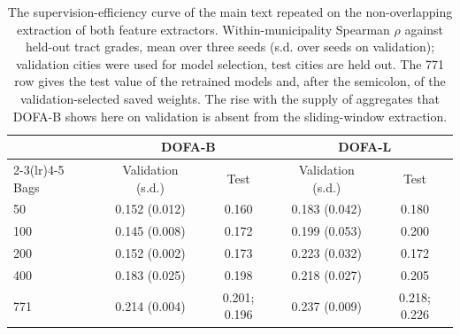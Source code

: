 \begin{table}[htbp]
\centering
\caption{The supervision-efficiency curve of the main text repeated on the non-overlapping extraction of both feature extractors. Within-municipality Spearman $\rho$ against held-out tract grades, mean over three seeds (s.d. over seeds on validation); validation cities were used for model selection, test cities are held out. The 771 row gives the test value of the retrained models and, after the semicolon, of the validation-selected saved weights. The rise with the supply of aggregates that DOFA-B shows here on validation is absent from the sliding-window extraction.}
\small
\begin{tabular}{lcccc}
\toprule
 & \multicolumn{2}{c}{DOFA-B} & \multicolumn{2}{c}{DOFA-L}\\
\cmidrule(lr){2-3}\cmidrule(lr){4-5}
Bags & Validation (s.d.) & Test & Validation (s.d.) & Test\\
\midrule
50 & 0.152 (0.012) & 0.160 & 0.183 (0.042) & 0.180\\
100 & 0.145 (0.008) & 0.172 & 0.199 (0.053) & 0.200\\
200 & 0.152 (0.002) & 0.173 & 0.223 (0.032) & 0.172\\
400 & 0.183 (0.025) & 0.198 & 0.218 (0.027) & 0.205\\
771 & 0.214 (0.004) & 0.201; 0.196 & 0.237 (0.009) & 0.218; 0.226\\
\bottomrule
\end{tabular}
\label{tab:supp_curve}
\end{table}
